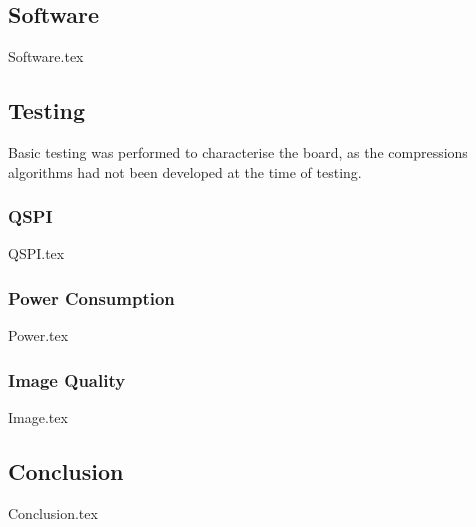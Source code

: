 \subsection{Software}\label{sec:v1-software}
    {Software.tex}

\subsection{Testing}\label{sec:v1-testing}

Basic testing was performed to characterise the board, as the compressions algorithms had not been developed at the time of testing.

    \subsubsection{QSPI}
        {QSPI.tex}

    \subsubsection{Power Consumption}
        {Power.tex}

    \subsubsection{Image Quality}
        {Image.tex}

\subsection{Conclusion}\label{sec:v1-conclusion}
    {Conclusion.tex}
